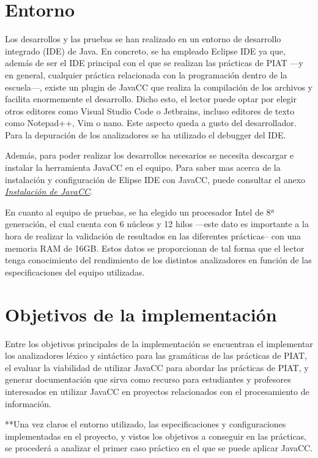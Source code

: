 \section{Entorno}
\noindent Los desarrollos y las pruebas se han realizado en un entorno de desarrollo integrado (IDE) de Java. En concreto, se ha empleado Eclipse IDE ya que, además de ser el IDE principal con el que se realizan las prácticas de PIAT ---y en general, cualquier práctica relacionada con la programación dentro de la escuela---, existe un plugin de JavaCC que realiza la compilación de los archivos y facilita enormemente el desarrollo. Dicho esto, el lector puede optar por elegir otros editores como Visual Studio Code o Jetbrains, incluso editores de texto como Notepad++, Vim o  nano. Este aspecto queda a gusto del desarrollador. Para la depuración de los analizadores se ha utilizado el debugger del IDE.

Además, para poder realizar los desarrollos necesarios se necesita descargar e instalar la herramienta JavaCC en el equipo. Para saber mas acerca de la instalación y configuración de Elipse IDE con JavaCC, puede consultar el anexo \hyperref[sec:instalaciondejavacc]{\textit{Instalación de JavaCC}}.

En cuanto al equipo de pruebas, se ha elegido un procesador Intel de 8ª generación, el cual cuenta con 6 núcleos y 12 hilos ---este dato es importante a la hora de realizar la validación de resultados en las diferentes prácticas-- con una memoria RAM de 16GB. Estos datos se proporcionan de tal forma que el lector tenga conocimiento del rendimiento de los distintos analizadores en función de  las especificaciones del equipo utilizadas.

\section{Objetivos de la implementación}
\noindent Entre los objetivos principales de la implementación se encuentran el implementar los analizadores léxico y sintáctico para las gramáticas de las prácticas de PIAT, el evaluar la viabilidad de utilizar JavaCC para abordar las prácticas de PIAT, y generar documentación que sirva como recurso para estudiantes y profesores interesados en utilizar JavaCC en proyectos relacionados con el procesamiento de información.

**Una vez claros el entorno utilizado, las especificaciones y configuraciones implementadas en el proyecto, y vistos los objetivos a conseguir en las prácticas, se procederá a analizar el primer caso práctico en el que se puede aplicar JavaCC.

